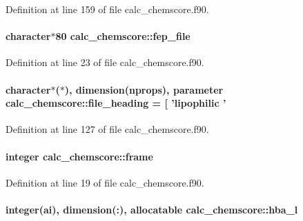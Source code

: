 Definition at line 159 of file calc\-\_\-chemscore.\-f90.

\hypertarget{classcalc__chemscore_a8a0c88973d83ec082072a7115b8c0e45}{
\paragraph[{fep\-\_\-file}]{\setlength{\rightskip}{0pt plus 5cm}character$\ast$80 calc\-\_\-chemscore\-::fep\-\_\-file}}\label{classcalc__chemscore_a8a0c88973d83ec082072a7115b8c0e45}


Definition at line 23 of file calc\-\_\-chemscore.\-f90.

\hypertarget{classcalc__chemscore_a7e04d3fd8fe18efe87ef287cc54572dd}{
\paragraph[{file\-\_\-heading}]{\setlength{\rightskip}{0pt plus 5cm}character$\ast$($\ast$), dimension({\bf nprops}), parameter calc\-\_\-chemscore\-::file\-\_\-heading = \mbox{[} 'lipophilic '}}\label{classcalc__chemscore_a7e04d3fd8fe18efe87ef287cc54572dd}


Definition at line 127 of file calc\-\_\-chemscore.\-f90.

\hypertarget{classcalc__chemscore_a4cd182377bd9390c602bd0a0c169a345}{
\paragraph[{frame}]{\setlength{\rightskip}{0pt plus 5cm}integer calc\-\_\-chemscore\-::frame}}\label{classcalc__chemscore_a4cd182377bd9390c602bd0a0c169a345}


Definition at line 19 of file calc\-\_\-chemscore.\-f90.

\hypertarget{classcalc__chemscore_acd1541a9ea18346f52dd8b3d8690928b}{
\paragraph[{hba\-\_\-l}]{\setlength{\rightskip}{0pt plus 5cm}integer(ai), dimension(\-:), allocatable calc\-\_\-chemscore\-::hba\-\_\-l}}\label{classcalc__chemscore_acd1541a9ea18346f52dd8b3d8690928b}


